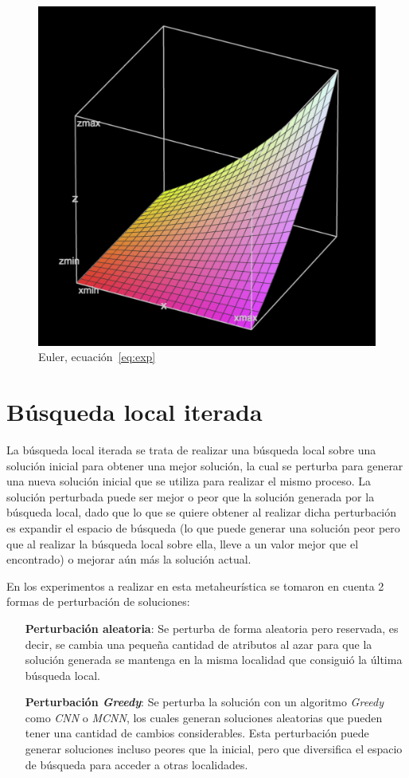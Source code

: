 \documentclass{ci5652}
\begin{document}
\begin{figure}[p]
	\centering
	\includegraphics[width=\linewidth]{euler-3b}
	\caption{Euler, ecuación~\ref{eq:exp}}
	\label{fig:euler3}
\end{figure}


\section{Búsqueda local iterada}
La búsqueda local iterada se trata de realizar una búsqueda local sobre una solución inicial para obtener una mejor solución, la cual se perturba para generar una nueva solución inicial que se utiliza para realizar el mismo proceso. La solución perturbada puede ser mejor o peor que la solución generada por la búsqueda local, dado que lo que se quiere obtener al realizar dicha perturbación es expandir el espacio de búsqueda (lo que puede generar una solución peor pero que al realizar la búsqueda local sobre ella, lleve a un valor mejor que el encontrado) o mejorar aún más la solución actual.

En los experimentos a realizar en esta metaheurística se tomaron en cuenta 2 formas de perturbación de soluciones:

\begin{itemize}
\item [\textbf{Perturbación aleatoria}:] Se perturba de forma aleatoria pero reservada, es decir, se cambia una pequeña cantidad de atributos al azar para que la solución generada se mantenga en la misma localidad que consiguió la última búsqueda local.
\item [\textbf{Perturbación \textit{Greedy}}:] Se perturba la solución con un algoritmo \textit{Greedy} como \textit{CNN }o \textit{MCNN}, los cuales generan soluciones aleatorias que pueden tener una cantidad de cambios considerables. Esta perturbación puede generar soluciones incluso peores que la inicial, pero que diversifica el espacio de búsqueda para acceder a otras localidades. 
\end{itemize}
\end{document}
